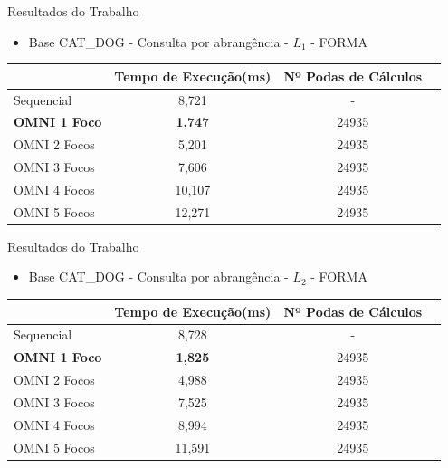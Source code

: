 \documentclass{beamer}
\begin{document}
\begin{frame}{Resultados do Trabalho}
 \begin{itemize}
  \item Base CAT\_DOG - Consulta por abrangência - $L_1$ - FORMA
 \end{itemize}
  
  \begin{table}[H]
    \centering
   \begin{tabular}{l c c c}
            &Tempo de Execução(ms)&Nº Podas de Cálculos\\ \hline
            Sequencial & 8,721 & - \\
            \textbf{OMNI 1 Foco} & \textbf{1,747} & 24935 \\
            OMNI 2 Focos & 5,201 & 24935 \\
            OMNI 3 Focos & 7,606 & 24935 \\
            OMNI 4 Focos & 10,107 & 24935 \\
            OMNI 5 Focos & 12,271 & 24935 \\ \hline
    \end{tabular}
\end{table}
  
\end{frame}

\begin{frame}{Resultados do Trabalho}
 \begin{itemize}
  \item Base CAT\_DOG - Consulta por abrangência - $L_2$ - FORMA
 \end{itemize}
  
  \begin{table}[H]
    \centering
   \begin{tabular}{l c c c}
            &Tempo de Execução(ms)&Nº Podas de Cálculos\\ \hline
            Sequencial & 8,728 & - \\
            \textbf{OMNI 1 Foco} & \textbf{1,825} & 24935 \\
            OMNI 2 Focos & 4,988 & 24935 \\
            OMNI 3 Focos & 7,525 & 24935 \\
            OMNI 4 Focos & 8,994 & 24935 \\
            OMNI 5 Focos & 11,591 & 24935 \\ \hline
    \end{tabular}
\end{table}
  
\end{frame}
\end{document}
